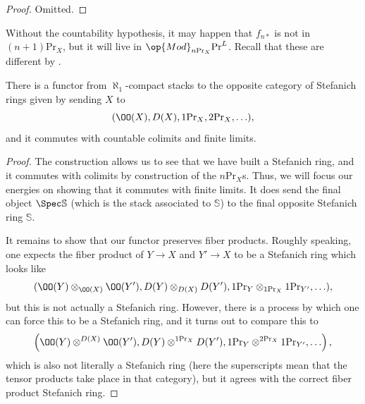 \documentclass[../notes.tex]{subfiles}
\begin{document}
\begin{proof}
	Omitted.
\end{proof}
\begin{remark}
	Without the countability hypothesis, it may happen that $f_{n*}$ is not in $(n+1)\mathrm{Pr}_X$, but it will live in $\op{Mod}_{n\mathrm{Pr}_X}\mathrm{Pr}^L$. Recall that these are different by .
\end{remark}
\begin{corollary}
	There is a functor from $\aleph_1$-compact stacks to the opposite category of Stefanich rings given by sending $X$ to
	\[(\OO(X),D(X),1\mathrm{Pr}_X,2\mathrm{Pr}_X,\ldots),\]
	and it commutes with countable colimits and finite limits.
\end{corollary}
\begin{proof}
	The construction allows us to see that we have built a Stefanich ring, and it commutes with colimits by construction of the $n\mathrm{Pr}_X$s. Thus, we will focus our energies on showing that it commutes with finite limits. It does send the final object $\Spec\mathbb S$ (which is the stack associated to $\mathbb S$) to the final opposite Stefanich ring $\mathbb S$.

	It remains to show that our functor preserves fiber products. Roughly speaking, one expects the fiber product of $Y\to X$ and $Y'\to X$ to be a Stefanich ring which looks like
	\[(\OO(Y)\otimes_{\OO(X)}\OO(Y'),D(Y)\otimes_{D(X)}D(Y'),1\mathrm{Pr}_Y\otimes_{1\mathrm{Pr}_X}1\mathrm{Pr}_{Y'},\ldots),\]
	but this is not actually a Stefanich ring. However, there is a process by which one can force this to be a Stefanich ring, and it turns out to compare this to
	\[\left(\OO(Y)\otimes^{D(X)}\OO(Y'),D(Y)\otimes^{1\mathrm{Pr}_X}D(Y'),1\mathrm{Pr}_Y\otimes^{2\mathrm{Pr}_X}1\mathrm{Pr}_{Y'},\ldots\right),\]
	which is also not literally a Stefanich ring (here the superscripts mean that the tensor products take place in that category), but it agrees with the correct fiber product Stefanich ring.
\end{proof}
\end{document}
